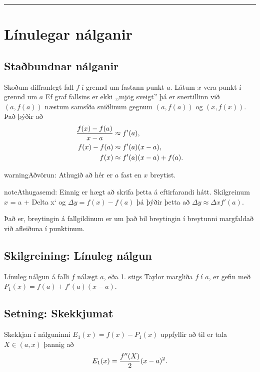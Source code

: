 \documentclass[b5paper,10pt,icelandic]{sphinxmanual}
\begin{document}
\bigskip\hrule{}\bigskip



\section{Línulegar nálganir}
\label{kafli03:linulegar-nalganir}

\subsection{Staðbundnar nálganir}
\label{kafli03:stabundnar-nalganir}
Skoðum diffranlegt fall \(f\) í grennd um fastann punkt
\(a\). Látum \(x\) vera punkt í grennd um \(a\)
Ef graf fallsins er ekki ,,mjög
sveigt” þá er snertillinn við \((a,f(a))\) næstum samsíða
sniðlinum gegnum \((a,f(a))\) og \((x,f(x))\).
Það þýðir að
\begin{gather}
\begin{split}\begin{aligned}
     \frac{f(x)-f(a)}{x-a} &\approx f'(a),\\
     f(x)-f(a) &\approx  f'(a)(x-a),\\
     f(x) &\approx f'(a)(x-a) + f(a).
\end{aligned}\end{split}\notag
\end{gather}
\begin{notice}{warning}{Aðvörun:}
Athugið að hér er \(a\) fast en \(x\) breytist.
\end{notice}

\begin{notice}{note}{Athugasemd:}
Einnig er hægt að skrifa þetta á eftirfarandi hátt.
Skilgreinum \(x\) = a + Delta x{}` og
\(\Delta y = f(x) - f(a)\) þá þýðir þetta að
\(\Delta y \approx \Delta x f'(a)\).

Það er, breytingin á fallgildinum er um það bil breytingin í
breytunni margfaldað við afleiðuna í punktinum.
\end{notice}


\subsection{Skilgreining: Línuleg nálgun}
\label{kafli03:skilgreining-linuleg-nalgun}
Línuleg nálgun á falli \(f\) nálægt \(a\), eða 1. stigs Taylor
margliða \(f\) í \(a\), er gefin með
\(P_1(x)=f(a)+f'(a)(x-a)\).


\subsection{Setning: Skekkjumat}
\label{kafli03:setning-skekkjumat}
Skekkjan í nálguninni \(E_1(x)=f(x)-P_1(x)\) uppfyllir að til er
tala \(X \in (a,x)\) þannig að
\begin{gather}
\begin{split}E_1(x)=\frac{f''(X)}{2}(x-a)^2.\end{split}\notag
\end{gather}
\end{document}
